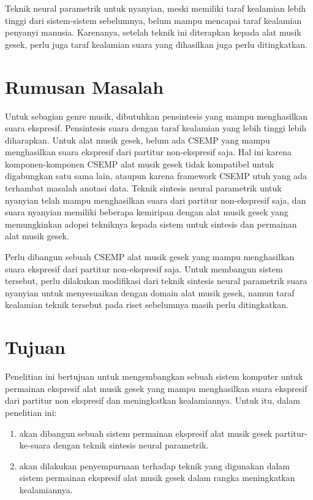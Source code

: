 Teknik neural parametrik untuk nyanyian, meski memiliki taraf kealamian lebih tinggi dari sistem-sistem sebelumnya, belum mampu mencapai taraf kealamian penyanyi manusia. \parencite{bonada2017singing} Karenanya, setelah teknik ini diterapkan kepada alat musik gesek, perlu juga taraf kealamian suara yang dihasilkan juga perlu ditingkatkan.

\section{Rumusan Masalah}

Untuk sebagian genre musik, dibutuhkan pensintesis yang mampu menghasilkan suara ekspresif. Pensintesis suara dengan taraf kealamian yang lebih tinggi lebih diharapkan. Untuk alat musik gesek, belum ada CSEMP yang mampu menghasilkan suara ekspresif dari partitur non-ekspresif saja. Hal ini karena komponen-komponen CSEMP alat musik gesek tidak kompatibel untuk digabungkan satu sama lain, ataupun karena framework CSEMP utuh yang ada terhambat masalah anotasi data. Teknik sintesis neural parametrik untuk nyanyian telah mampu menghasilkan suara dari partitur non-ekspresif saja, dan suara nyanyian memiliki beberapa kemiripan dengan alat musik gesek yang memungkinkan adopsi tekniknya kepada sistem untuk sintesis dan permainan alat musik gesek.

Perlu dibangun sebuah CSEMP alat musik gesek yang mampu menghasilkan suara ekspresif dari partitur non-ekspresif saja. Untuk membangun sistem tersebut, perlu dilakukan modifikasi dari teknik sintesis neural parametrik suara nyanyian untuk menyesuaikan dengan domain alat musik gesek, namun taraf kealamian teknik tersebut pada riset sebelumnya masih perlu ditingkatkan.

\section{Tujuan}

Penelitian ini bertujuan untuk mengembangkan sebuah sistem komputer untuk permainan ekspresif alat musik gesek yang mampu menghasilkan suara ekspresif dari partitur non ekspresif dan meningkatkan kealamiannya. Untuk itu, dalam penelitian ini:
\begin{enumerate}
	\item akan dibangun sebuah sistem permainan ekspresif alat musik gesek partitur-ke-suara dengan teknik sintesis neural parametrik.
	\item akan dilakukan penyempurnaan terhadap teknik yang digunakan dalam sistem permainan ekspresif alat musik gesek dalam rangka meningkatkan kealamiannya.
\end{enumerate}

